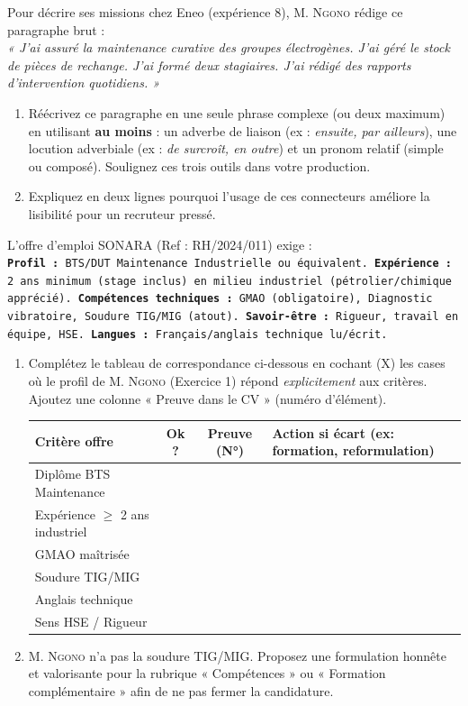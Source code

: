 \documentclass[11pt]{article}
\begin{document}
\begin{exercice}
Pour décrire ses missions chez Eneo (expérience 8), M. \textsc{Ngono} rédige ce paragraphe brut :\\
\textit{« J'ai assuré la maintenance curative des groupes électrogènes. J'ai géré le stock de pièces de rechange. J'ai formé deux stagiaires. J'ai rédigé des rapports d'intervention quotidiens. »}
\begin{enumerate}
    \item Réécrivez ce paragraphe en une seule phrase complexe (ou deux maximum) en utilisant \textbf{au moins} : un adverbe de liaison (ex : \textit{ensuite, par ailleurs}), une locution adverbiale (ex : \textit{de surcroît, en outre}) et un pronom relatif (simple ou composé). Soulignez ces trois outils dans votre production.
    \item Expliquez en deux lignes pourquoi l'usage de ces connecteurs améliore la lisibilité pour un recruteur pressé.
\end{enumerate}
\end{exercice}

\begin{exercice}
L'offre d'emploi SONARA (Ref : RH/2024/011) exige :\\
\texttt{\textbf{Profil :} BTS/DUT Maintenance Industrielle ou équivalent. \textbf{Expérience :} 2 ans minimum (stage inclus) en milieu industriel (pétrolier/chimique apprécié). \textbf{Compétences techniques :} GMAO (obligatoire), Diagnostic vibratoire, Soudure TIG/MIG (atout). \textbf{Savoir-être :} Rigueur, travail en équipe, HSE. \textbf{Langues :} Français/anglais technique lu/écrit.}
\begin{enumerate}
    \item Complétez le tableau de correspondance ci-dessous en cochant (X) les cases où le profil de M. \textsc{Ngono} (Exercice 1) répond \textit{explicitement} aux critères. Ajoutez une colonne « Preuve dans le CV » (numéro d'élément).
    \begin{tabular}{|l|c|c|p{4cm}|}
    \hline
    \textbf{Critère offre} & \textbf{Ok ?} & \textbf{Preuve (N°)} & \textbf{Action si écart (ex: formation, reformulation)} \\ \hline
    Diplôme BTS Maintenance & & & \\ \hline
    Expérience $\ge$ 2 ans industriel & & & \\ \hline
    GMAO maîtrisée & & & \\ \hline
    Soudure TIG/MIG & & & \\ \hline
    Anglais technique & & & \\ \hline
    Sens HSE / Rigueur & & & \\ \hline
    \end{tabular}
    \item M. \textsc{Ngono} n'a pas la soudure TIG/MIG. Proposez une formulation honnête et valorisante pour la rubrique « Compétences » ou « Formation complémentaire » afin de ne pas fermer la candidature.
\end{enumerate}
\end{exercice}
\end{document}
